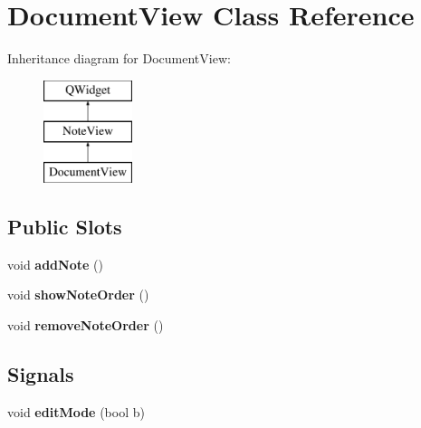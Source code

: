 \hypertarget{class_document_view}{\section{Document\-View Class Reference}
\label{class_document_view}
}
Inheritance diagram for Document\-View\-:\begin{figure}[H]
\begin{center}
\leavevmode
\includegraphics[height=3.000000cm]{class_document_view}
\end{center}
\end{figure}
\subsection*{Public Slots}
\begin{DoxyCompactItemize}
\item 
\hypertarget{class_document_view_af26298f04ab0f1dcb4e1088a7e9f446c}{void {\bfseries add\-Note} ()}\label{class_document_view_af26298f04ab0f1dcb4e1088a7e9f446c}

\item 
\hypertarget{class_document_view_a4b5566516da6ce783288b11a327c21f4}{void {\bfseries show\-Note\-Order} ()}\label{class_document_view_a4b5566516da6ce783288b11a327c21f4}

\item 
\hypertarget{class_document_view_a11e7b17da59e993a4415c9cba0e0cffc}{void {\bfseries remove\-Note\-Order} ()}\label{class_document_view_a11e7b17da59e993a4415c9cba0e0cffc}

\end{DoxyCompactItemize}
\subsection*{Signals}
\begin{DoxyCompactItemize}
\item 
\hypertarget{class_document_view_a61fb03bbc747e63ab3b9c7c3e927528f}{void {\bfseries edit\-Mode} (bool b)}\label{class_document_view_a61fb03bbc747e63ab3b9c7c3e927528f}

\end{DoxyCompactItemize}
